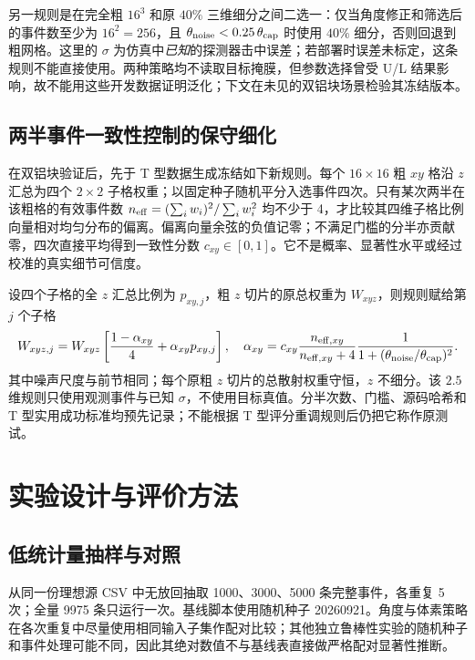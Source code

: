 \documentclass[UTF8,fontset=none,zihao=-4,a4paper]{ctexart}
\begin{document}
另一规则是在完全粗 $16^3$ 和原 $40\%$ 三维细分之间二选一：仅当角度修正和筛选后的事件数至少为 $16^2=256$，且 $\theta_{\rm noise}<0.25\,\theta_{\rm cap}$ 时使用 $40\%$ 细分，否则回退到粗网格。这里的 $\sigma$ 为仿真中\emph{已知}的探测器击中误差；若部署时误差未标定，这条规则不能直接使用。两种策略均不读取目标掩膜，但参数选择曾受 U/L 结果影响，故不能用这些开发数据证明泛化；下文在未见的双铝块场景检验其冻结版本。

\subsection{两半事件一致性控制的保守细化}
在双铝块验证后，先于 T 型数据生成冻结如下新规则。每个 $16\times16$ 粗 $xy$ 格沿 $z$ 汇总为四个 $2\times2$ 子格权重；以固定种子随机平分入选事件四次。只有某次两半在该粗格的有效事件数 $n_{\rm eff}=(\sum_iw_i)^2/\sum_iw_i^2$ 均不少于 4，才比较其四维子格比例向量相对均匀分布的偏离。偏离向量余弦的负值记零；不满足门槛的分半亦贡献零，四次直接平均得到一致性分数 $c_{xy}\in[0,1]$。它不是概率、显著性水平或经过校准的真实细节可信度。

设四个子格的全 $z$ 汇总比例为 $p_{xy,j}$，粗 $z$ 切片的原总权重为 $W_{xyz}$，则规则赋给第 $j$ 个子格
\begin{equation}
W_{xyz,j}=W_{xyz}\left[\frac{1-\alpha_{xy}}{4}+\alpha_{xy}p_{xy,j}\right],\quad
\alpha_{xy}=c_{xy}\frac{n_{{\rm eff},xy}}{n_{{\rm eff},xy}+4}
\frac{1}{1+(\theta_{\rm noise}/\theta_{\rm cap})^2}.
\label{eq:split-confidence}
\end{equation}
其中噪声尺度与前节相同；每个原粗 $z$ 切片的总散射权重守恒，$z$ 不细分。该 $2.5$ 维规则只使用观测事件与已知 $\sigma$，不使用目标真值。分半次数、门槛、源码哈希和 T 型实用成功标准均预先记录；不能根据 T 型评分重调规则后仍把它称作原测试。

\section{实验设计与评价方法}
\subsection{低统计量抽样与对照}
从同一份理想源 CSV 中无放回抽取 \num{1000}、\num{3000}、\num{5000} 条完整事件，各重复 5 次；全量 \num{9975} 条只运行一次。基线脚本使用随机种子 \num{20260921}。角度与体素策略在各次重复中尽量使用相同输入子集作配对比较；其他独立鲁棒性实验的随机种子和事件处理可能不同，因此其绝对数值不与基线表直接做严格配对显著性推断。
\end{document}
